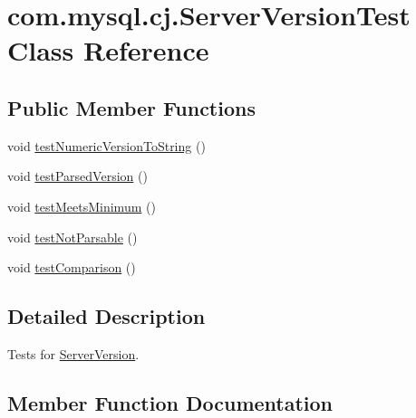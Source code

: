 \hypertarget{classcom_1_1mysql_1_1cj_1_1_server_version_test}{}\section{com.\+mysql.\+cj.\+Server\+Version\+Test Class Reference}
\label{classcom_1_1mysql_1_1cj_1_1_server_version_test}
\subsection*{Public Member Functions}
\begin{DoxyCompactItemize}
\item 
void \mbox{\hyperlink{classcom_1_1mysql_1_1cj_1_1_server_version_test_ae90335d8e7d8ea17b691a83938f12d4b}{test\+Numeric\+Version\+To\+String}} ()
\item 
void \mbox{\hyperlink{classcom_1_1mysql_1_1cj_1_1_server_version_test_a8a61c0c82091deadffbd37452e9babe5}{test\+Parsed\+Version}} ()
\item 
void \mbox{\hyperlink{classcom_1_1mysql_1_1cj_1_1_server_version_test_adff5ed1aaaa77aa090f5c400f03f6b8e}{test\+Meets\+Minimum}} ()
\item 
void \mbox{\hyperlink{classcom_1_1mysql_1_1cj_1_1_server_version_test_ae201a653f64fca24101dfa558d6acf71}{test\+Not\+Parsable}} ()
\item 
void \mbox{\hyperlink{classcom_1_1mysql_1_1cj_1_1_server_version_test_a1a39218e12e065e998d28b6992eff6ac}{test\+Comparison}} ()
\end{DoxyCompactItemize}


\subsection{Detailed Description}
Tests for \mbox{\hyperlink{classcom_1_1mysql_1_1cj_1_1_server_version}{Server\+Version}}. 

\subsection{Member Function Documentation}
\mbox{\label{classcom_1_1mysql_1_1cj_1_1_server_version_test_a1a39218e12e065e998d28b6992eff6ac}} 
